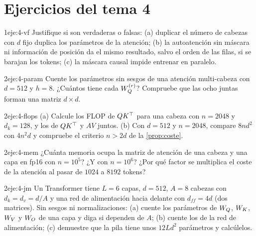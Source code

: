 \section*{Ejercicios del tema 4}

\begin{ejercicio}{1}{eje:4-vf}
Justifique si son verdaderas o falsas: (a) duplicar el número de cabezas con $d$ fijo duplica los parámetros de la atención; (b) la autoatención sin máscara ni información de posición da el mismo resultado, salvo el orden de las filas, si se barajan los tokens; (c) la máscara causal impide entrenar en paralelo.
\end{ejercicio}

\begin{ejercicio}{2}{eje:4-param}
Cuente los parámetros sin sesgos de una atención multi-cabeza con $d=512$ y $h=8$. ¿Cuántos tiene cada $W_{Q}^{(r)}$? Compruebe que las ocho juntas forman una matriz $d\times d$.
\end{ejercicio}

\begin{ejercicio}{2}{eje:4-flops}
(a) Calcule los FLOP de $QK^{\top}$ para una cabeza con $n=2048$ y $d_k=128$, y los de $QK^{\top}$ y $AV$ juntos. (b) Con $d=512$ y $n=2048$, compare $8nd^{2}$ con $4n^{2}d$ y compruebe el criterio $n>2d$ de la \cref{prop:coste}.
\end{ejercicio}

\begin{ejercicio}{2}{eje:4-mem}
¿Cuánta memoria ocupa la matriz de atención de una cabeza y una capa en fp16 con $n=10^{5}$? ¿Y con $n=10^{6}$? ¿Por qué factor se multiplica el coste de la atención al pasar de $1024$ a $8192$ tokens?
\end{ejercicio}

\begin{ejercicio}{2}{eje:4-jm}
Un Transformer tiene $L=6$ capas, $d=512$, $A=8$ cabezas con $d_k=d_v=d/A$ y una red de alimentación hacia delante con $d_{ff}=4d$ (dos matrices). Sin sesgos ni normalizaciones: (a) cuente los parámetros de $W_{Q}$, $W_{K}$, $W_{V}$ y $W_{O}$ de una capa y diga si dependen de $A$; (b) cuente los de la red de alimentación; (c) demuestre que la pila tiene unos $12Ld^{2}$ parámetros y calcúlelos.
\end{ejercicio}

